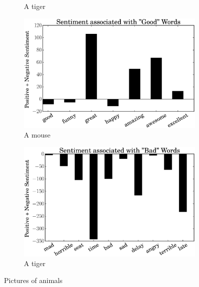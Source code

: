 \documentclass[a4paper, 12pt]{article}
\begin{document}
\begin{figure}
\begin{subfigure}[b]{0.45\textwidth}
        \caption{A tiger}
        \label{fig:tiger}
    \end{subfigure}
    \hfill %
    \begin{subfigure}[b]{0.45\textwidth}
        \includegraphics[width=\textwidth]{airline_good_words}
        \caption{A mouse}
        \label{fig:mouse}
    \end{subfigure}
    \begin{subfigure}[b]{0.45\textwidth}
        \includegraphics[width=\textwidth]{airline_bad_words}
        \caption{A tiger}
        \label{fig:tiger}
    \end{subfigure}
    \caption{Pictures of animals}\label{fig:animals}
\end{figure}
\end{document}
